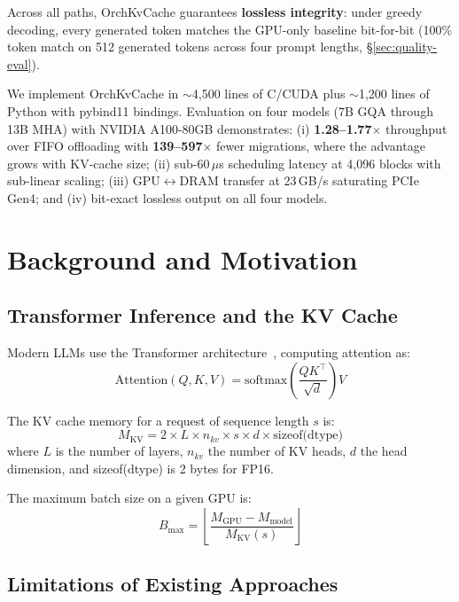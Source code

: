\documentclass[conference]{IEEEtran}
\begin{document}
Across all paths, OrchKvCache guarantees \textbf{lossless integrity}: under greedy decoding, every generated token matches the GPU-only baseline bit-for-bit (100\% token match on 512 generated tokens across four prompt lengths, \S\ref{sec:quality-eval}).

We implement OrchKvCache in ${\sim}$4,500 lines of C/CUDA plus ${\sim}$1,200 lines of Python with pybind11 bindings. Evaluation on four models (7B GQA through 13B MHA) with NVIDIA A100-80GB demonstrates: (i) \textbf{1.28--1.77$\times$} throughput over FIFO offloading with \textbf{139--597$\times$} fewer migrations, where the advantage grows with KV-cache size; (ii) sub-60\,$\mu$s scheduling latency at 4,096 blocks with sub-linear scaling; (iii) GPU$\leftrightarrow$DRAM transfer at 23\,GB/s saturating PCIe Gen4; and (iv) bit-exact lossless output on all four models.

\section{Background and Motivation}

\subsection{Transformer Inference and the KV Cache}

Modern LLMs use the Transformer architecture~\cite{transformer}, computing attention as:
\begin{equation}
\text{Attention}(Q, K, V) = \text{softmax}\!\left(\frac{QK^\top}{\sqrt{d}}\right) V
\end{equation}

The KV cache memory for a request of sequence length $s$ is:
\begin{equation}
M_{\text{KV}} = 2 \times L \times n_{kv} \times s \times d \times \text{sizeof(dtype)}
\end{equation}
where $L$ is the number of layers, $n_{kv}$ the number of KV heads, $d$ the head dimension, and sizeof(dtype) is 2 bytes for FP16.

The maximum batch size on a given GPU is:
\begin{equation}
B_{\max} = \left\lfloor \frac{M_{\text{GPU}} - M_{\text{model}}}{M_{\text{KV}}(s)} \right\rfloor
\end{equation}

\subsection{Limitations of Existing Approaches}
\end{document}
